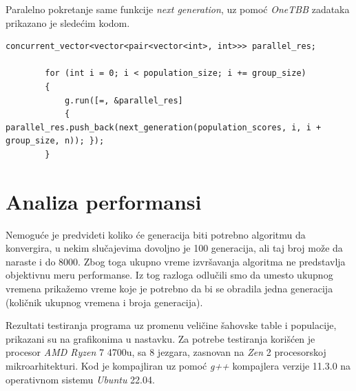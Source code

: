 \documentclass[12pt, a4paper]{article}
\begin{document}
	Paralelno pokretanje same funkcije \textit{next generation}, uz pomoć \textit{OneTBB} zadataka prikazano je sledećim kodom.
	
	\begin{lstlisting}[caption={Paralelno pokretanje funkcije za računanje dela sledeće generacije}]
		concurrent_vector<vector<pair<vector<int>, int>>> parallel_res;
		
		for (int i = 0; i < population_size; i += group_size)
		{
			g.run([=, &parallel_res]
			{ parallel_res.push_back(next_generation(population_scores, i, i + group_size, n)); });
		}
	\end{lstlisting}
	
	\newpage
	
	\section{Analiza performansi}
	
	Nemoguće je predvideti koliko će generacija biti potrebno algoritmu da konvergira, u nekim slučajevima dovoljno je 100 generacija, ali taj broj može da naraste i do 8000. Zbog toga ukupno vreme izvršavanja algoritma ne predstavlja objektivnu meru performanse. Iz tog razloga odlučili smo da umesto ukupnog vremena prikažemo vreme koje je potrebno da bi se obradila jedna generacija (količnik ukupnog vremena i broja generacija).
	
	Rezultati testiranja programa uz promenu veličine šahovske table i populacije, prikazani su na grafikonima u nastavku. Za potrebe testiranja korišćen je procesor \textit{AMD Ryzen} 7 4700u, sa 8 jezgara, zasnovan na \textit{Zen} 2 procesorskoj mikroarhitekturi. Kod je kompajliran uz pomoć \textit{g++} kompajlera verzije 11.3.0 na operativnom sistemu \textit{Ubuntu} 22.04.\\
	
\end{document}

